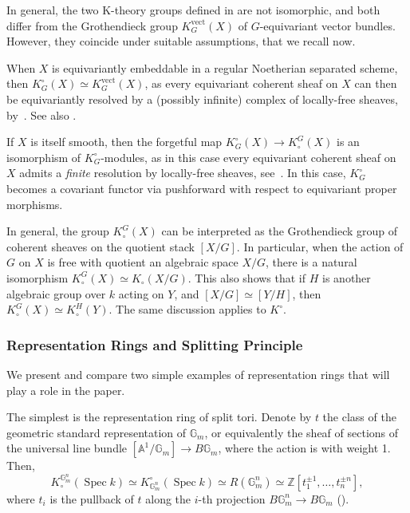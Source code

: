 \documentclass[12pt]{amsart}
\newcommand\spec{\operatorname{Spec}}
\newcommand\Gm{\mathbb{G}_m}
\newcommand\A{\mathbb{A}}
\newcommand\Z{\mathbb{Z}}
\newcommand{\Kring}{K^{\circ}}
\newcommand{\Kgroup}{K_{\circ}}
\theoremstyle{definition}
\begin{document}
In general, the two K-theory groups defined in  are not isomorphic, and both differ from the Grothendieck group $K_G^{\mathrm{vect}}(X)$ of $G$-equivariant vector bundles. However, they coincide under suitable assumptions, that we recall now.

When $X$ is equivariantly embeddable in a regular Noetherian separated scheme, then $\Kring_G(X)\simeq K_G^{\mathrm{vect}}(X)$, as every equivariant coherent sheaf on $X$ can then be equivariantly resolved by a (possibly infinite) complex of locally-free sheaves, by~\cite[Section 2]{Thomason-EquivariantResolution}. See also .

If $X$ is itself smooth, then the forgetful map $\Kring_G(X)\rightarrow\Kgroup^G(X)$ is an isomorphism of $\Kring_G$-modules, as in this case every equivariant coherent sheaf on $X$ admits a \emph{finite} resolution by locally-free sheaves, see~\cite[Theorem 5.7]{Thomason-equivariantKtheory}. In this case, $\Kring_G$ becomes a covariant functor via pushforward with respect to equivariant proper morphisms.

In general, the group $\Kgroup^G(X)$ can be interpreted as the Grothendieck group of coherent sheaves on the quotient stack $[X/G]$. In particular, when the action of $G$ on $X$ is free with quotient an algebraic space $X/G$, there is a natural isomorphism $\Kgroup^G(X)\simeq\Kgroup(X/G)$. This also shows that if $H$ is another algebraic group over $k$ acting on $Y$, and $[X/G]\simeq[Y/H]$, then $\Kgroup^G(X)\simeq\Kgroup^H(Y)$. The same discussion applies to $\Kring$.

\subsubsection{Representation Rings and Splitting Principle} \label{sec: representation rings}

We present and compare two simple examples of representation rings that will play a role in the paper.

The simplest is the representation ring of split tori. Denote by $t$ the class of the geometric standard representation of $\Gm$, or equivalently the sheaf of sections of the universal line bundle $[\A^1/\Gm]\rightarrow B\Gm$, where the action is with weight 1. Then,
\begin{equation}\label{eq: representation ring tori}
    \Kgroup^{\Gm^n}(\spec k)\simeq\Kring_{\Gm^n}(\spec k)\simeq R(\Gm^n)\simeq\Z[t_1^{\pm1},\ldots,t_n^{\pm n}],
\end{equation}
where $t_i$ is the pullback of $t$ along the $i$-th projection $B\Gm^n\rightarrow B\Gm$ (\cite[Theorem 12.12, Section 12.e]{Milne_algebraicgroups}).
\end{document}
